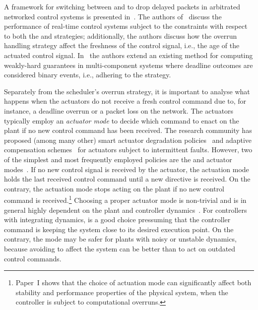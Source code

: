 %
A framework for switching between \tK{} and \tS{} to drop delayed packets in arbitrated networked control systems is presented in~\cite{Soudbakhsh:2018}.
The authors of~\cite{Pazzaglia:2018} discuss the performance of real-time control systems subject to the \tAM{} constraints with respect to both the \tK{} and \tS{} strategies; additionally, the authors discuss how the overrun handling strategy affect the freshness of the control signal, i.e., the age of the actuated control signal.
In~\cite{Ernst:2019} the authors extend an existing method for computing weakly-hard guarantees in multi-component systems where deadline outcomes are considered binary events, i.e., adhering to the \tK{} strategy.

Separately from the scheduler's overrun strategy, it is important to analyse what happens when the actuators do not receive a fresh control command due to, for instance, a deadline overrun or a packet loss on the network.
The actuators typically employ an \emph{actuator mode} to decide which command to enact on the plant if no new control command has been received.
The research community has proposed (among many other) smart actuator degradation policies~\cite{Ma:2018} and adaptive compensation schemes~\cite{Xing:2017} for actuators subject to intermittent faults.
However, two of the simplest and most frequently employed policies are the \tZ{} and \tH{} actuator modes~\cite{Schenato:2009}.
If no new control signal is received by the actuator, the \tH{} actuation mode holds the last received control command until a new directive is received.
On the contrary, the \tZ{} actuation mode stops acting on the plant if no new control command is received.\footnote{Paper~I shows that the choice of actuation mode can significantly affect both stability and performance properties of the physical system, when the controller is subject to computational overruns.}
Choosing a proper actuator mode is non-trivial and is in general highly dependent on the plant and controller dynamics~\cite{Schenato:2009}.
For controllers with integrating dynamics, \tH{} is a good choice pressuming that the controller command is keeping the system close to its desired execution point.
On the contrary, the \tZ{} mode may be safer for plants with noisy or unstable dynamics, because avoiding to affect the system can be better than to act on outdated control commands.



